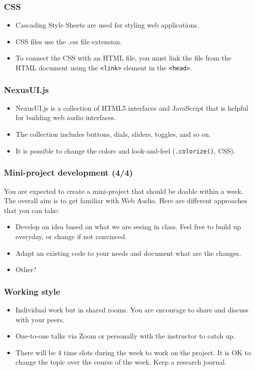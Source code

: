 \documentclass[screen, aspectratio=43]{beamer}
\begin{document}
%
\begin{frame}
\frametitle{CSS}
\begin{itemize}
\item Cascading Style Sheets are used for styling web applications.
\item CSS files use the .css file extension.
\item To connect the CSS with an HTML file, you must link the file from the HTML document using the \texttt{<link>} element in the \texttt{<head>}.
\end{itemize} 
\end{frame}
%
%
\begin{frame}
\frametitle{NexusUI.js}
\begin{itemize}
\item NexusUI.js is a collection of HTML5 interfaces and JavaScript that is helpful for building web audio interfaces.
\item The collection includes buttons, dials, sliders, toggles, and so on.
\item It is possible to change the colors and look-and-feel (\texttt{.colorize()}, CSS).
\end{itemize} 
\end{frame}
%
\begin{frame}
\frametitle{Mini-project development (4/4)}
You are expected to create a mini-project that should be doable within a week. The overall aim is to get familiar with Web Audio. Here are different approaches that you can take:
\begin{itemize}
\item Develop an idea based on what we are seeing in class. Feel free to build up everyday, or change if not convinced.
\item Adapt an existing code to your needs and document what are the changes.
\item Other?
\end{itemize}
\end{frame}
%
\begin{frame}
\frametitle{Working style}
\begin{itemize}
\item Individual work but in shared rooms. You are encourage to share and discuss with your peers.
\item One-to-one talks via Zoom or personally with the instructor to catch up.
\item There will be 4 time slots during the week to work on the project. It is OK to change the topic over the course of the week. Keep a research journal.
\end{itemize}
\end{frame}
\end{document}
